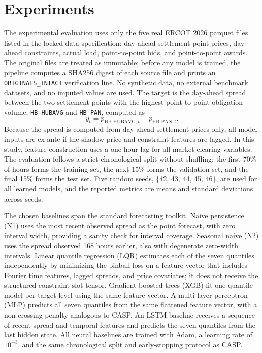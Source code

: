 \documentclass{article}
\begin{document}
\section{Experiments}
\label{sec:experiments}

The experimental evaluation uses only the five real ERCOT 2026 parquet files listed in the locked data specification: day-ahead settlement-point prices, day-ahead constraints, actual load, point-to-point bids, and point-to-point awards. The original files are treated as immutable; before any model is trained, the pipeline computes a SHA256 digest of each source file and prints an \texttt{ORIGINALS\_INTACT} verification line. No synthetic data, no external benchmark datasets, and no imputed values are used. The target is the day-ahead spread between the two settlement points with the highest point-to-point obligation volume, \texttt{HB\_HUBAVG} and \texttt{HB\_PAN}, computed as
\[
y_t = p_{\mathrm{HB\_HUBAVG},t} - p_{\mathrm{HB\_PAN},t}.
\]
Because the spread is computed from day-ahead settlement prices only, all model inputs are ex-ante if the shadow-price and constraint features are lagged. In this study, feature construction uses a one-hour lag for all market-clearing variables. The evaluation follows a strict chronological split without shuffling: the first 70\% of hours forms the training set, the next 15\% forms the validation set, and the final 15\% forms the test set. Five random seeds, \{42, 43, 44, 45, 46\}, are used for all learned models, and the reported metrics are means and standard deviations across seeds.

The chosen baselines span the standard forecasting toolkit. Naive persistence (N1) uses the most recent observed spread as the point forecast, with zero interval width, providing a sanity check for interval coverage. Seasonal naive (N2) uses the spread observed 168 hours earlier, also with degenerate zero-width intervals. Linear quantile regression (LQR) estimates each of the seven quantiles independently by minimizing the pinball loss on a feature vector that includes Fourier time features, lagged spreads, and price covariates; it does not receive the structured constraint-slot tensor. Gradient-boosted trees (XGB) fit one quantile model per target level using the same feature vector. A multi-layer perceptron (MLP) predicts all seven quantiles from the same flattened feature vector, with a non-crossing penalty analogous to CASP. An LSTM baseline receives a sequence of recent spread and temporal features and predicts the seven quantiles from the last hidden state. All neural baselines are trained with Adam, a learning rate of $10^{-3}$, and the same chronological split and early-stopping protocol as CASP.
\end{document}
